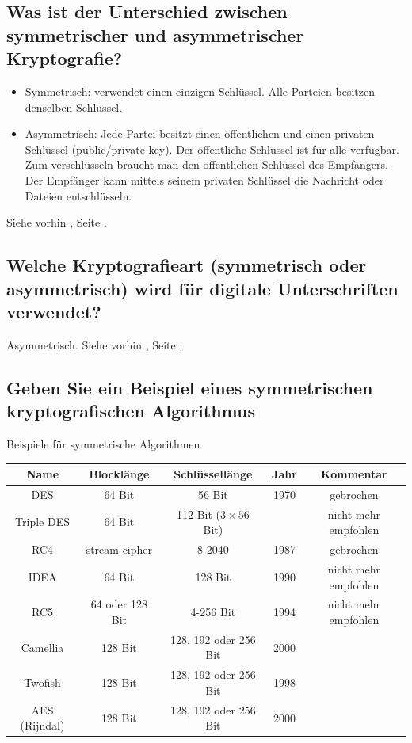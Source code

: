 \subsection*{Was ist der Unterschied zwischen symmetrischer und asymmetrischer Kryptografie?}
\begin{itemize}
    \item Symmetrisch: verwendet einen einzigen Schlüssel. Alle Parteien besitzen denselben Schlüssel.
    \item Asymmetrisch: Jede Partei besitzt einen öffentlichen und einen privaten Schlüssel (public/private key). Der öffentliche Schlüssel ist für alle verfügbar. Zum verschlüsseln braucht man den öffentlichen Schlüssel des Empfängers. Der Empfänger kann mittels seinem privaten Schlüssel die Nachricht oder Dateien entschlüsseln.
\end{itemize}
Siehe vorhin \underline{}, Seite \pageref{par:Confidentiality}.

\subsection*{Welche Kryptografieart (symmetrisch oder asymmetrisch) wird für digitale Unterschriften verwendet?}
Asymmetrisch. Siehe vorhin \underline{}, Seite \pageref{par:Non-Repudiation}.

\subsection*{Geben Sie ein Beispiel eines symmetrischen kryptografischen Algorithmus}
Beispiele für symmetrische Algorithmen\\
\begin{tabular}{|c|c|c|c|c|}
    \hline
    Name&Blocklänge&Schlüssellänge&Jahr&Kommentar\\
    \hline
    DES&64 Bit&56 Bit&1970&gebrochen\\
    Triple DES&64 Bit&112 Bit ($3\times56$ Bit)&  &nicht mehr empfohlen\\
    RC4&stream cipher&8-2040&1987&gebrochen\\
    IDEA&64 Bit&128 Bit&1990&nicht mehr empfohlen\\
    RC5&64 oder 128 Bit&4-256 Bit&1994&nicht mehr empfohlen\\
    Camellia&128 Bit&128, 192 oder 256 Bit&2000& \\
    Twofish&128 Bit&128, 192 oder 256 Bit&1998& \\
    AES (Rijndal)&128 Bit&128, 192 oder 256 Bit&2000& \\
    \hline
\end{tabular}

